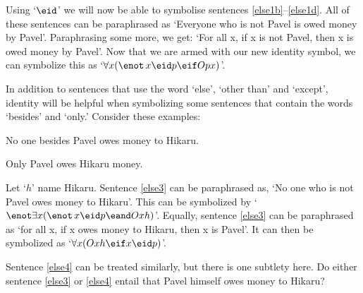 Using `$\eid $' we will now be able to symbolise sentences \ref{else1b}--\ref{else1d}. All of these sentences can be  paraphrased as `Everyone who is not Pavel is owed money by Pavel'. Paraphrasing some more, we get: `For all x, if x is not Pavel, then x is owed money by Pavel'. Now that we are armed with our new identity symbol, we can symbolize this as `$\forall x (\enot\, x\eid p \eif Opx)$'.

In addition to sentences that use the word `else', `other than' and `except', identity will be helpful when symbolizing some sentences that contain the words `besides' and `only.' Consider these examples:

\begin{earg}
\item[\ex{else3}] No one besides Pavel owes money to Hikaru.
\item[\ex{else4}] Only Pavel owes Hikaru money.
\end{earg}
Let `$h$' name Hikaru. Sentence \ref{else3} can be paraphrased as, `No one who is not Pavel owes money to Hikaru'. This can be symbolized by `$\enot\exists x(\enot\,x \eid p \eand Oxh)$'. Equally, sentence \ref{else3} can be paraphrased as `for all x, if x owes money to Hikaru, then x is Pavel'. It can then be symbolized as `$\forall x (Oxh \eif x \eid p)$'.

Sentence \ref{else4} can be treated similarly, but there is one subtlety here. Do either sentence \ref{else3} or \ref{else4} entail that Pavel himself owes money to Hikaru?









